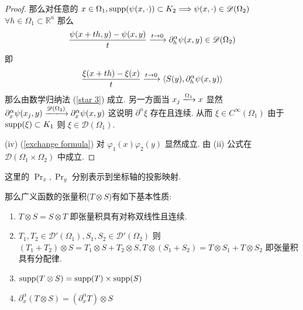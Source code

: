 \documentclass[11pt]{ctexart}[UTF8]
\begin{document}
\begin{proof}
    那么对任意的 $x \in \Omega_1, \operatorname{supp}(\psi(x,\cdot)) \subset K_{2} \Longrightarrow \psi(x,\cdot) \in \mathscr{D}(\Omega_2)$\\
    $\forall h \in \Omega_{1} \subset \mathbb{R}^{n}$ 那么
    \begin{equation*}
        \frac{\psi(x+th,y)-\psi(x,y)}{t}\xlongrightarrow{t \to 0} \partial_{h}^{\alpha} \psi(x,y) \in \mathscr{D}(\Omega_2)
    \end{equation*}
    即
    \begin{equation*}
        \frac{\xi(x+th)-\xi(x)}{t} \xlongrightarrow{t \to 0} \langle S(y), \partial_{h}^{\alpha} \psi(x,y) \rangle
    \end{equation*}
    那么由数学归纳法 (\ref{star 3}) 成立. 另一方面当 $x_{j} \xlongrightarrow{\Omega_{1}}x$ 显然 $\partial_{x}^{\alpha} \psi(x_{j},y) \xlongrightarrow{\mathscr{D}(\Omega_2)} \partial_{x}^{\alpha} \psi(x,y)$
    这说明 $\partial^{\alpha} \xi$ 存在且连续. 从而 $\xi \in C^{\infty}(\Omega_1)$ 由于 $\operatorname{supp}(\xi) \subset K_{1}$ 则 $\xi \in \mathscr{D}(\Omega_1)$.\par
    (iv) (\ref{exchange formula}) 对 $\varphi_{1}(x)\varphi_{2}(y)$ 显然成立. 由 (ii) 公式在 $\mathscr{D}(\Omega_1 \times \Omega_2)$ 中成立.

\end{proof}
\begin{remark}
    这里的 $\operatorname{Pr}_{x}, \operatorname{Pr}_{y}$ 分别表示到坐标轴的投影映射.
\end{remark}

那么广义函数的张量积($T \otimes S$)有如下基本性质:
\begin{property}\leavevmode
    \begin{enumerate}
        \item $T \otimes S = S \otimes T$ 即张量积具有对称双线性且连续.
        \item $T_{1}, T_{2} \in \mathscr{D}'(\Omega_1), S_{1}, S_{2} \in \mathscr{D}'(\Omega_2)$ 则 $(T_{1}+T_{2})\otimes S = T_{1}\otimes S + T_{2}\otimes S, T\otimes (S_{1}+S_{2}) = T\otimes S_{1} + T\otimes S_{2}$ 即张量积具有分配律.
        \item $\operatorname{supp}(T \otimes S) = \operatorname{supp}(T) \times \operatorname{supp}(S)$
        \item $\partial_{x}^{\alpha}(T \otimes S) = (\partial_{x}^{\alpha} T) \otimes S$
    \end{enumerate}
\end{property}
\end{document}
